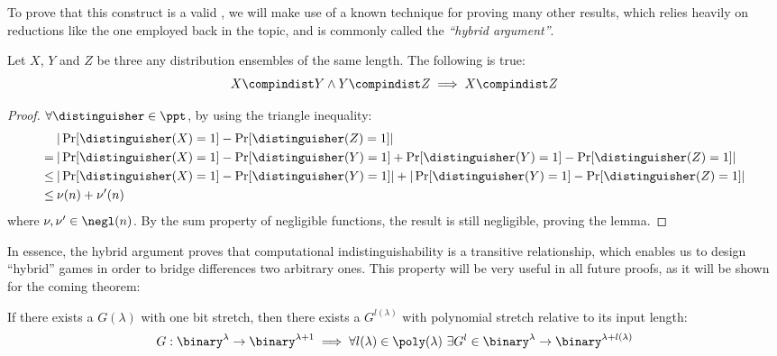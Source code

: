 To prove that this construct is a valid \prg, we will make use of a known technique for proving many other results, which relies heavily on reductions like the one employed back in the \owf{} topic, and is commonly called the \emph{``hybrid argument''}.
    
\begin{lemma} \label{lem:hybrid}
    Let $X$, $Y$ and $Z$ be three any distribution ensembles of the same length. The following is true:
    \[
        X \compindist Y \wedge Y \compindist Z \implies X \compindist Z
    \] 
\end{lemma}
\begin{proof}
    $\forall \distinguisher \in \ppt$, by using the triangle inequality:
    \begin{align*}
        & |\Pr[\distinguisher(X) = 1] - \Pr[\distinguisher(Z) = 1]| \\
        =\:& |\Pr[\distinguisher(X) = 1] - \Pr[\distinguisher(Y) = 1] + \Pr[\distinguisher(Y) = 1] - \Pr[\distinguisher(Z) = 1]| \\
        \leq\:& |\Pr[\distinguisher(X) = 1] - \Pr[\distinguisher(Y) = 1]| + |\Pr[\distinguisher(Y) = 1] - \Pr[\distinguisher(Z) = 1]| \\
        \leq\:& \nu(n) + \nu'(n)
    \end{align*}
    where $\nu, \nu' \in \negl(n)$. By the sum property of negligible functions, the result is still negligible, proving the lemma.
\end{proof}

In essence, the hybrid argument proves that computational indistinguishability is a transitive relationship, which enables us to design ``hybrid'' games in order to bridge differences two arbitrary ones. This property will be very useful in all future proofs, as it will be shown for the coming theorem:

\begin{theorem}
    If there exists a \prg{} $G(\lambda)$ with one bit stretch, then there exists a \prg{} $G^{l(\lambda)}$ with polynomial stretch relative to its input length:
    \begin{equation*}
        G : \binary^\lambda \to \binary^{\lambda + 1} \implies \forall l(\lambda) \in \poly(\lambda)\ \exists G^l \in \binary^\lambda \to \binary^{\lambda + l(\lambda)} \qedhere
    \end{equation*} 
\end{theorem}

